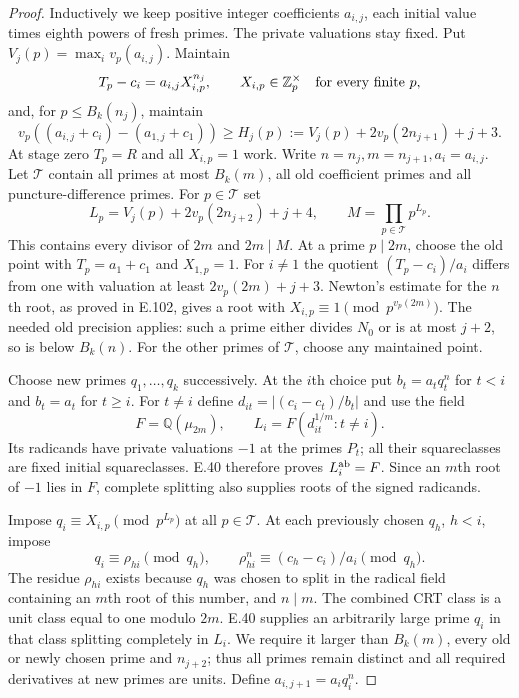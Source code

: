 \begin{proof}
Inductively we keep positive integer coefficients $a_{i,j}$, each
initial value times eighth powers of fresh primes. The private
valuations stay fixed. Put $V_j(p)=\max_i v_p(a_{i,j})$. Maintain
\[
 T_p-c_i=a_{i,j}X_{i,p}^{n_j},\qquad
 X_{i,p}\in\mathbb Z_p^\times \quad\hbox{for every finite }p,
\]
and, for $p\le B_k(n_j)$, maintain
\[
 v_p((a_{i,j}+c_i)-(a_{1,j}+c_1))\ge
 H_j(p):=V_j(p)+2v_p(2n_{j+1})+j+3.
\]
At stage zero $T_p=R$ and all $X_{i,p}=1$ work.
Write $n=n_j,m=n_{j+1},a_i=a_{i,j}$. Let $\mathcal T$ contain
all primes at most $B_k(m)$, all old coefficient primes and all
puncture-difference primes. For $p\in\mathcal T$ set
\[
 L_p=V_j(p)+2v_p(2n_{j+2})+j+4,
 \qquad M=\prod_{p\in\mathcal T}p^{L_p}.
\]
This contains every divisor of $2m$ and $2m\mid M$.
At a prime $p\mid2m$, choose the old point with
$T_p=a_1+c_1$ and $X_{1,p}=1$. For $i\ne1$ the quotient
$(T_p-c_i)/a_i$ differs from one with valuation at least
$2v_p(2m)+j+3$. Newton's estimate for the $n$th root, as proved
in E.102, gives a root with
$X_{i,p}\equiv1\pmod{p^{v_p(2m)}}$.
The needed old precision applies: such a prime either divides
$N_0$ or is at most $j+2$, so is below $B_k(n)$.
For the other primes of $\mathcal T$, choose any maintained point.

Choose new primes $q_1,\ldots,q_k$ successively. At the $i$th
choice put $b_t=a_tq_t^n$ for $t<i$ and $b_t=a_t$ for $t\ge i$.
For $t\ne i$ define $d_{it}=|(c_i-c_t)/b_t|$ and use the field
\[
 F=\mathbb Q(\mu_{2m}),\qquad L_i=F(d_{it}^{1/m}:t\ne i).
\]
Its radicands have private valuations $-1$ at the primes $P_t$;
all their squareclasses are fixed initial squareclasses. E.40
therefore proves $L_i^{\rm ab}=F$. Since an $m$th root of $-1$
lies in $F$, complete splitting also supplies roots of the signed
radicands.

Impose $q_i\equiv X_{i,p}\pmod{p^{L_p}}$ at all
$p\in\mathcal T$. At each previously chosen $q_h$, $h<i$, impose
\[
 q_i\equiv\rho_{hi}\pmod{q_h},\qquad
 \rho_{hi}^{n}\equiv(c_h-c_i)/a_i\pmod{q_h}.
\]
The residue $\rho_{hi}$ exists because $q_h$ was chosen to split
in the radical field containing an $m$th root of this number, and
$n\mid m$. The combined CRT class is a unit class equal to one
modulo $2m$. E.40 supplies an arbitrarily large prime $q_i$ in
that class splitting completely in $L_i$. We require it larger
than $B_k(m)$, every old or newly chosen prime and $n_{j+2}$;
thus all primes remain distinct and all required derivatives at
new primes are units. Define $a_{i,j+1}=a_iq_i^n$.


\end{proof}
